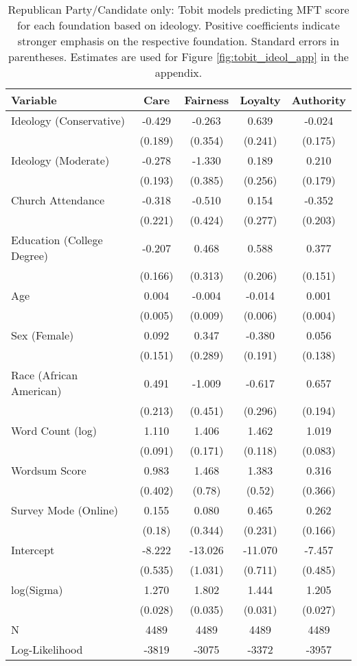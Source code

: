 \begin{table}[ht]
\centering
\caption{Republican Party/Candidate only: Tobit models predicting MFT score for each foundation based 
           on ideology. Positive coefficients indicate stronger emphasis on the respective 
           foundation. Standard errors in parentheses. Estimates are used for  
           Figure \ref{fig:tobit_ideol_app} in the appendix.} 
\label{tab:tobit_rep}
\begingroup\footnotesize
\begin{tabular}{lcccc}
  \hline
Variable & Care & Fairness & Loyalty & Authority \\ 
  \hline
Ideology (Conservative) & -0.429 &  -0.263 &   0.639 & -0.024 \\ 
   & (0.189) & (0.354) & (0.241) & (0.175) \\ 
  Ideology (Moderate) & -0.278 &  -1.330 &   0.189 &  0.210 \\ 
   & (0.193) & (0.385) & (0.256) & (0.179) \\ 
  Church Attendance & -0.318 &  -0.510 &   0.154 & -0.352 \\ 
   & (0.221) & (0.424) & (0.277) & (0.203) \\ 
  Education (College Degree) & -0.207 &   0.468 &   0.588 &  0.377 \\ 
   & (0.166) & (0.313) & (0.206) & (0.151) \\ 
  Age &  0.004 &  -0.004 &  -0.014 &  0.001 \\ 
   & (0.005) & (0.009) & (0.006) & (0.004) \\ 
  Sex (Female) &  0.092 &   0.347 &  -0.380 &  0.056 \\ 
   & (0.151) & (0.289) & (0.191) & (0.138) \\ 
  Race (African American) &  0.491 &  -1.009 &  -0.617 &  0.657 \\ 
   & (0.213) & (0.451) & (0.296) & (0.194) \\ 
  Word Count (log) &  1.110 &   1.406 &   1.462 &  1.019 \\ 
   & (0.091) & (0.171) & (0.118) & (0.083) \\ 
  Wordsum Score &  0.983 &   1.468 &   1.383 &  0.316 \\ 
   & (0.402) & (0.78) & (0.52) & (0.366) \\ 
  Survey Mode (Online) &  0.155 &   0.080 &   0.465 &  0.262 \\ 
   & (0.18) & (0.344) & (0.231) & (0.166) \\ 
  Intercept & -8.222 & -13.026 & -11.070 & -7.457 \\ 
   & (0.535) & (1.031) & (0.711) & (0.485) \\ 
  log(Sigma) &  1.270 &   1.802 &   1.444 &  1.205 \\ 
   & (0.028) & (0.035) & (0.031) & (0.027) \\ 
   \hline
N & 4489 & 4489 & 4489 & 4489 \\ 
  Log-Likelihood & -3819 & -3075 & -3372 & -3957 \\ 
   \hline
\end{tabular}
\endgroup
\end{table}
